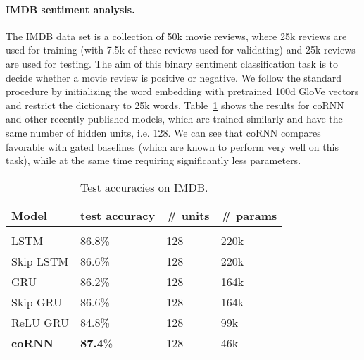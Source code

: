\documentclass{article} \usepackage{iclr2021_conference,times}
\newcommand{\Tref}[1]{Table~\ref{#1}}
\begin{document}
\paragraph{IMDB sentiment analysis.}
The IMDB data set \citep{imdb} is a collection of 50k movie reviews, where 25k reviews are used for training (with 7.5k of these reviews used for validating) and 25k reviews are used for testing. The aim of this binary sentiment classification task is to decide whether a movie review is positive or negative. We follow the standard procedure by initializing the word embedding with pretrained 100d GloVe \citep{glove} vectors and restrict the dictionary to 25k words. \Tref{tab:imdb} shows the results for coRNN and other recently published models, which are trained similarly and have the same number of hidden units, i.e. 128. We can see that coRNN compares favorable with gated baselines (which are known to perform very well on this task), while at the same time requiring significantly less parameters.
\begin{table}[htbp]
\caption{Test accuracies on IMDB.}
\label{tab:imdb}
\begin{center}
\begin{tabular}{llll}
{ Model} &  test accuracy & \# units &  \# params
\\ \hline \\
LSTM \citep{imdb_base}&  86.8\% & 128 & 220k\\
Skip LSTM\citep{imdb_base}& 86.6\%  & 128 & 220k\\
GRU \citep{imdb_base}& 86.2\% & 128 & 164k\\
Skip GRU \citep{imdb_base}& 86.6\% & 128 & 164k \\
ReLU GRU \citep{imdb_gru}& 84.8\% & 128 & 99k \\
\textbf{coRNN} & \textbf{87.4}\% & 128 & 46k\\
\end{tabular}
\end{center}
\end{table}
\end{document}

